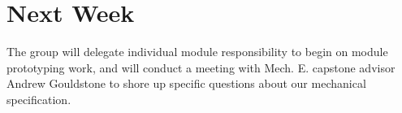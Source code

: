 \documentclass[11pt]{article}
\begin{document}
\section{Next Week}
\label{sec:org63010c3}

The group will delegate individual module responsibility to begin on module prototyping work, and will conduct a meeting with Mech. E. capstone advisor Andrew Gouldstone to shore up specific questions about our mechanical specification.
\end{document}
